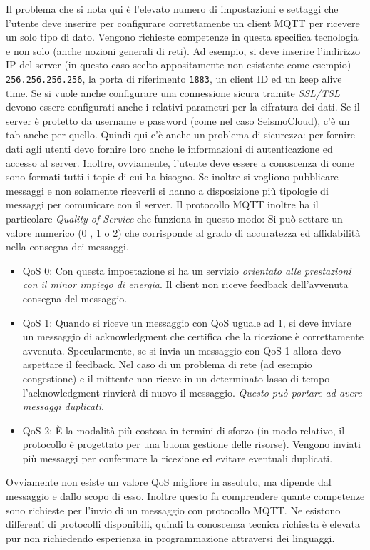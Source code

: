 \documentclass[a4paper,10pt]{memoir}
\begin{document}
Il problema che si nota qui è l'elevato numero di impostazioni e settaggi che l'utente deve inserire per configurare correttamente un client MQTT per ricevere un solo tipo di dato.
Vengono richieste competenze in questa specifica tecnologia e non solo (anche nozioni generali di reti). Ad esempio, si deve inserire l'indirizzo IP del server (in questo caso scelto appositamente non esistente come esempio) \texttt{256.256.256.256}, la porta di riferimento \texttt{1883}, un client ID ed un keep alive time. Se si vuole anche configurare una connessione sicura tramite \textit{SSL/TSL} devono essere configurati anche i relativi parametri per la cifratura dei dati.
Se il server è protetto da username e password (come nel caso SeismoCloud), c'è un tab anche per quello. Quindi qui c'è anche un problema di sicurezza: per fornire dati agli utenti devo fornire loro anche le informazioni di autenticazione ed accesso al server.
Inoltre, ovviamente, l'utente deve essere a conoscenza di come sono formati tutti i topic di cui ha bisogno.
Se inoltre si vogliono pubblicare messaggi e non solamente riceverli si hanno a disposizione più tipologie di messaggi per comunicare con il server.
Il protocollo MQTT inoltre ha il particolare \textit{Quality of Service} che funziona in questo modo:
Si può settare un valore numerico (0 , 1 o 2) che corrisponde al grado di accuratezza ed affidabilità nella consegna dei messaggi.

\begin{itemize}
    \item QoS 0: Con questa impostazione si ha un servizio \textit{orientato alle prestazioni con il minor impiego di energia}. Il client non riceve feedback dell'avvenuta consegna del messaggio.
    \item QoS 1: Quando si riceve  un messaggio con QoS uguale ad 1, si deve inviare un messaggio di acknowledgment che certifica che la ricezione è correttamente avvenuta. Specularmente, se si invia un messaggio con QoS 1 allora devo aspettare il feedback. Nel caso di un problema di rete (ad esempio congestione) e il mittente non riceve in un determinato lasso di tempo l'acknowledgment rinvierà di nuovo il messaggio. \textit{Questo può portare ad avere messaggi duplicati}.
    \item QoS 2: È la modalità più costosa in termini di sforzo (in modo relativo, il protocollo è progettato per una buona gestione delle risorse). Vengono inviati più messaggi per confermare la ricezione ed evitare eventuali duplicati.
\end{itemize}
Ovviamente non esiste un valore QoS migliore in assoluto, ma dipende dal messaggio e dallo scopo di esso.
Inoltre questo fa comprendere quante competenze sono richieste per l'invio di un messaggio con protocollo MQTT.
Ne esistono differenti di protocolli disponibili, quindi la conoscenza tecnica richiesta è elevata pur non richiedendo esperienza in programmazione attraversi dei linguaggi.
\end{document}
